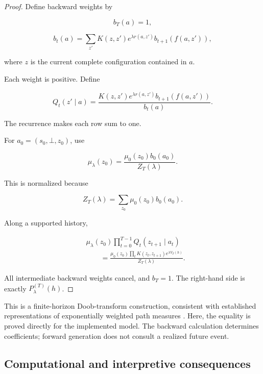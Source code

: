 \documentclass[11pt]{article}
\theoremstyle{remark}
\begin{document}
\begin{proof}
Define backward weights by

\begin{equation}
b_T(a)=1,
\end{equation}

\begin{equation}
b_t(a)
=
\sum_{z'}
K(z,z')e^{\lambda r(a,z')}
b_{t+1}(f(a,z')),
\end{equation}

where \(z\) is the current complete configuration contained in \(a\).

Each weight is positive. Define

\begin{equation}
Q_t(z'\mid a)
=
\frac{
K(z,z')e^{\lambda r(a,z')}
b_{t+1}(f(a,z'))
}{
b_t(a)
}.
\end{equation}

The recurrence makes each row sum to one.

For \(a_0=(s_0,\bot,z_0)\), use

\begin{equation}
\mu_\lambda(z_0)
=
\frac{\mu_0(z_0)b_0(a_0)}{Z_T(\lambda)}.
\end{equation}

This is normalized because

\begin{equation}
Z_T(\lambda)
=
\sum_{z_0}\mu_0(z_0)b_0(a_0).
\end{equation}

Along a supported history,

\begin{align}
&\mu_\lambda(z_0)
\prod_{t=0}^{T-1}Q_t(z_{t+1}\mid a_t)\\
&\qquad=
\frac{
\mu_0(z_0)\prod_tK(z_t,z_{t+1})
e^{\lambda V_T(h)}
}{
Z_T(\lambda)
}.
\end{align}

All intermediate backward weights cancel, and \(b_T=1\). The right-hand side is exactly \(P_\lambda^{(T)}(h)\).
\end{proof}

This is a finite-horizon Doob-transform construction, consistent with established representations of exponentially weighted path measures \cite{chetrite2015ld}. Here, the equality is proved directly for the implemented model. The backward calculation determines coefficients; forward generation does not consult a realized future event.

\subsection{Computational and interpretive consequences}
\end{document}
